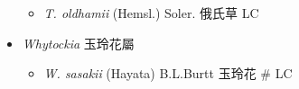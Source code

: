 \begin{itemize}
  \begin{itemize}
        \item[] \textit{T. oldhamii} (Hemsl.) Soler.  俄氏草   LC
  \end{itemize}
 \item[] \textit{Whytockia} 玉玲花屬
                                
  \begin{itemize}
        \item[] \textit{W. sasakii} (Hayata) B.L.Burtt  玉玲花  \# LC
  \end{itemize}
  \end{itemize}
